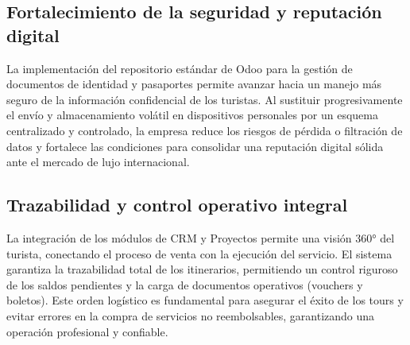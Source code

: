\subsection{Fortalecimiento de la seguridad y reputación digital}

\begin{indentedsubsection}
La implementación del repositorio estándar de Odoo para la gestión de documentos de identidad y pasaportes permite avanzar hacia un manejo más seguro de la información confidencial de los turistas. Al sustituir progresivamente el envío y almacenamiento volátil en dispositivos personales por un esquema centralizado y controlado, la empresa reduce los riesgos de pérdida o filtración de datos y fortalece las condiciones para consolidar una reputación digital sólida ante el mercado de lujo internacional.

\end{indentedsubsection}

\subsection{Trazabilidad y control operativo integral}

\begin{indentedsubsection}
La integración de los módulos de CRM y Proyectos permite una visión 360° del turista, conectando el proceso de venta con la ejecución del servicio. El sistema garantiza la trazabilidad total de los itinerarios, permitiendo un control riguroso de los saldos pendientes y la carga de documentos operativos (vouchers y boletos). Este orden logístico es fundamental para asegurar el éxito de los tours y evitar errores en la compra de servicios no reembolsables, garantizando una operación profesional y confiable.

\end{indentedsubsection}

